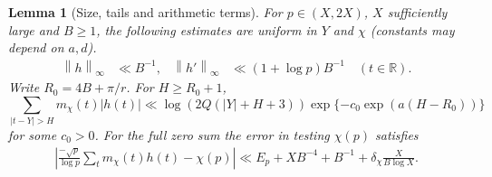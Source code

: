 \documentclass[11pt]{article}
\newtheorem{lemma}[theorem]{Lemma}
\newcommand{\R}{\mathbb R}\newcommand{\C}{\mathbb C}
\newcommand{\norm}[1]{\left\lVert #1\right\rVert}
\newcommand{\abs}[1]{\left\lvert #1\right\rvert}
\begin{document}
\begin{lemma}[Size, tails and arithmetic terms]\label{lem:filter}
For $p\in(X,2X)$, $X$ sufficiently large and $B\ge1$, the following estimates are uniform in $Y$ and $\chi$ (constants may depend on $a,d$).
\begin{align}
 \norm h_\infty&\ll B^{-1},&
 \norm{h'}_\infty&\ll (1+\log p)B^{-1}\quad(t\in\R).
 \label{eq:norm}
\end{align}
Write $R_0=4B+\pi/r$. For $H\ge R_0+1$,
\begin{equation}\label{eq:tail}
 \sum_{|t-Y|>H}m_\chi(t)|h(t)|
 \ll \log(2Q(|Y|+H+3))\exp\{-c_0\exp(a(H-R_0))\}
\end{equation}
for some $c_0>0$. For the full zero sum the error in testing $\chi(p)$ satisfies
\begin{align}
 \abs{\frac{-\sqrt p}{\log p}\sum_t m_\chi(t)h(t)-\chi(p)}
 \ll E_p + X B^{-4}+B^{-1}+\delta_\chi\frac{X}{B\log X}.
 \label{eq:approx}
\end{align}
\end{lemma}
\end{document}
